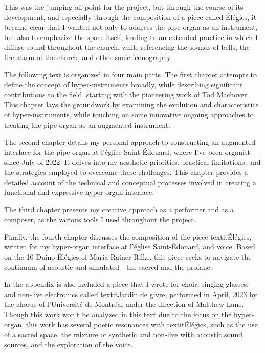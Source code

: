 \documentclass[12pt,twoside,maitrise]{dms_ks}
\theoremstyle{definition}
\begin{document}
This was the jumping off point for the project, but through the course of its development, and especially through the composition of a piece called Élégies, it became clear that I wanted not only to address the pipe organ as an instrument, but also to emphasize the space itself, leading to an extended practice in which I diffuse sound throughout the church, while referencing the sounds of bells, the fire alarm of the church, and other sonic iconography. 

The following text is organized in four main parts. 
The first chapter attempts to define the concept of hyper-instruments broadly, while describing significant contributions to the field, starting with the pioneering work of Tod Machover. 
This chapter lays the groundwork by examining the evolution and characteristics of hyper-instruments, while touching on some innovative ongoing approaches to treating the pipe organ as an augmented instrument.

The second chapter details my personal approach to constructing an augmented interface for the pipe organ at l’église Saint-Édouard, where I've been organist since July of 2022. 
It delves into my aesthetic priorities, practical limitations, and the strategies employed to overcome these challenges. 
This chapter provides a detailed account of the technical and conceptual processes involved in creating a functional and expressive hyper-organ interface.

The third chapter presents my creative approach as a performer and as a composer, as the various tools I used throughout the project. 

Finally, the fourth chapter discusses the composition of the piece textit{Élégies}, written for my hyper-organ interface at l’église Saint-Édouard, and voice. 
Based on the 10 Duino Élégies of Maria-Rainer Rilke, this piece seeks to navigate the continuum of acoustic and simulated---the sacred and the profane.

In the appendix is also included a piece that I wrote for choir, singing glasses, and non-live electronics called textit{Jardin de givre}, performed in April, 2023 by the chorus of l'Université de Montréal under the direction of Matthew Lane. Though this work won't be analyzed in this text due to the focus on the hyper-organ, this work has several poetic resonances with textit{Élégies}, such as the use of a sacred space, the mixture of synthetic and non-live with acoustic sound sources, and the exploration of the voice.

\end{document}

